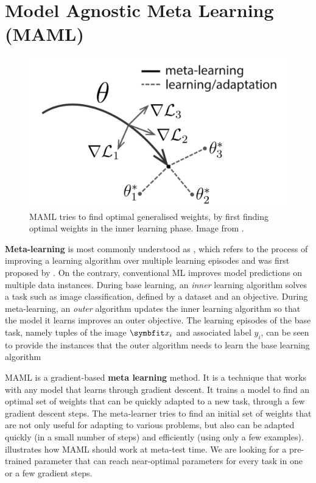 \section{Model Agnostic Meta Learning (MAML)}\label{sec:maml}


\begin{figure}
    \centering
    \includegraphics[scale=0.23]{chapters/assets/fsl/maml.png}
    \caption{MAML tries to find optimal generalised weights, by first finding optimal weights in the inner learning phase. Image from \parencite{Finn2017Model-agnosticNetworks}.}
    \label{fig:maml}
\end{figure}
\textbf{Meta-learning} is most commonly understood as , which refers to the process of improving a learning algorithm over multiple learning episodes and was first proposed by \textcite{schmidhuber:1987:srl}. On the contrary, conventional ML improves model predictions on multiple data instances. 
During base learning, an \emph{inner} learning algorithm solves a task such as image classification, defined by a dataset and an objective. During meta-learning, an \emph{outer} algorithm updates the inner learning algorithm so that the model it learns improves an outer objective.
The learning episodes of the base task, namely tuples of the image $\bfitx_i$ and associated label $y_i$, can be seen to provide the instances that the outer algorithm needs to learn the base learning algorithm

MAML is a gradient-based \textbf{meta learning} method. It is a technique that works with any model that learns through gradient descent. It trains a model to find an optimal set of weights that can be quickly adapted to a new task, through a few gradient descent steps. The meta-learner tries to find an initial set of weights that are not only useful for adapting to various problems, but also can be adapted quickly (in a small number of steps) and efficiently (using only a few examples).
 illustrates how MAML should work at meta-test time. We are looking for a pre-trained parameter that can reach near-optimal parameters for every task in one or a few gradient steps.

